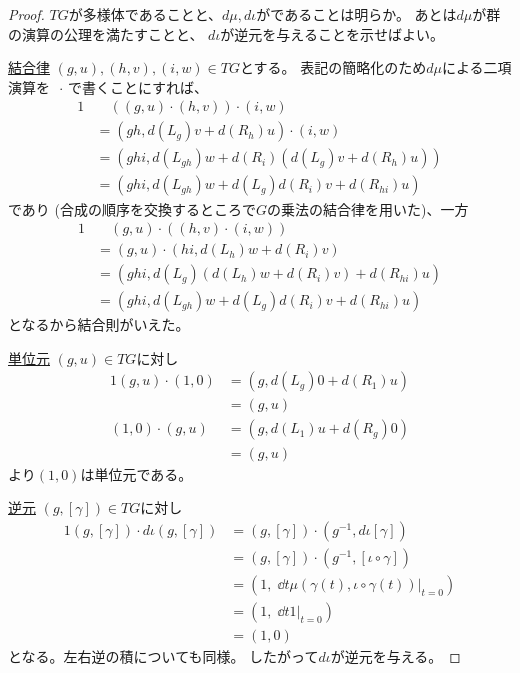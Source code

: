 \documentclass[report]{jlreq}
\begin{document}
\begin{proof}
    $TG$が多様体であることと、$d\mu, d\iota$が{\smooth}であることは明らか。
    あとは$d\mu$が群の演算の公理を満たすことと、
    $d\iota$が逆元を与えることを示せばよい。
    
    \uline{結合律} \quad
    $(g, u), (h, v), (i, w) \in TG$とする。
    表記の簡略化のため$d\mu$による二項演算を
    $\, \cdot \,$で書くことにすれば、
    \begin{alignat}{1}
        &\quad ((g, u) \cdot (h, v)) \cdot (i, w) \\
        &= (gh, d(L_g) v + d(R_h) u) \cdot (i, w) \\
        &= (ghi, d(L_{gh}) w + d(R_i) (d(L_g) v + d(R_h) u)) \\
        &= (ghi, d(L_{gh}) w + d(L_g) d(R_i) v + d(R_{hi}) u)
    \end{alignat}
    であり (合成の順序を交換するところで$G$の乗法の結合律を用いた)、一方
    \begin{alignat}{1}
        &\quad (g, u) \cdot ((h, v) \cdot (i, w)) \\
        &= (g, u) \cdot (hi, d(L_h) w + d(R_i) v) \\
        &= (ghi, d(L_g) (d(L_h) w + d(R_i) v) + d(R_{hi}) u) \\
        &= (ghi, d(L_{gh}) w + d(L_g) d(R_i) v + d(R_{hi}) u)
    \end{alignat}
    となるから結合則がいえた。

    \uline{単位元} \quad
    $(g, u) \in TG$に対し
    \begin{alignat}{1}
        (g, u) \cdot (1, 0)
            &= (g, d(L_g) 0 + d(R_1) u) \\
            &= (g, u) \\
        (1, 0) \cdot (g, u)
            &= (g, d(L_1) u + d(R_g) 0) \\
            &= (g, u)
    \end{alignat}
    より$(1, 0)$は単位元である。

    \uline{逆元} \quad
    $(g, [\gamma]) \in TG$に対し
    \begin{alignat}{1}
        (g, [\gamma]) \cdot d\iota(g, [\gamma])
            &= (g, [\gamma]) \cdot (g^{-1}, d\iota [\gamma]) \\
            &= (g, [\gamma]) \cdot (g^{-1}, [\iota \circ \gamma]) \\
            &= \left(
                1, \;
                \dd{t} \mu(\gamma(t), \iota \circ \gamma(t)) \Big|_{t = 0}
            \right) \\
            &= \left(
                1, \;
                \dd{t} 1 \Big|_{t = 0}
            \right) \\
            &= (1, 0)
    \end{alignat}
    となる。左右逆の積についても同様。
    したがって$d\iota$が逆元を与える。
\end{proof}
\end{document}
